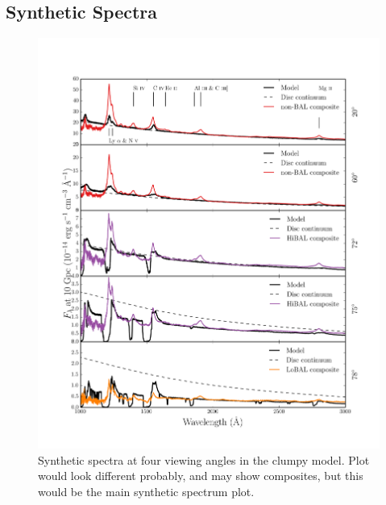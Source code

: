 \documentclass[useAMS,usenatbib]{mn2e_x}
\begin{document}
\subsection{Synthetic Spectra}

\begin{figure} %
\centering
\includegraphics[width=1.0\textwidth]{figures/uvspec.png}
\caption
{
Synthetic spectra at four viewing angles in the clumpy model. Plot would look different probably,
and may show composites, but this would be the main synthetic spectrum plot.
}
\label{fig:uvspec}
\end{figure} %

\end{document}
